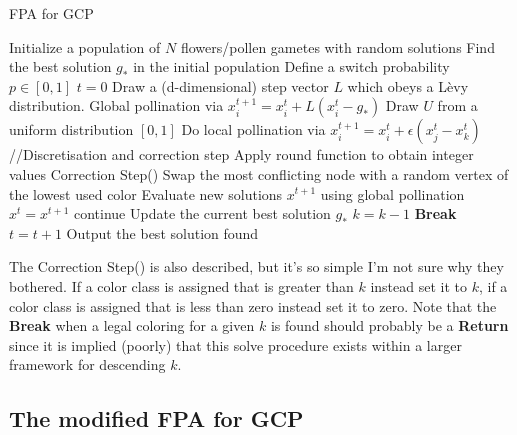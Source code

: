 \begin{algorithm}[H]
    \caption{FPA for GCP}
    \label{FPA1}
    \begin{algorithmic}[1] %
         			
			\State Initialize a population of $N$ flowers/pollen gametes with random solutions
			\State Find the best solution $g_*$ in the initial population
			\State Define a switch probability $p \in [0,1]$
			\State $t=0$
					 
						\State Draw a (d-dimensional) step vector $L$ which obeys a L\`evy distribution.
						\State Global pollination via $x_i^{t+1} = x_i^{t} + L(x_i^{t} - g_*)$
					\Else
						\State Draw $U$ from a uniform distribution $[0,1]$
						\State Do local pollination via $x_i^{t+1} = x_i^{t} + \epsilon(x_j^{t} - x_k^{t})$
					\EndIf
					\State //Discretisation and correction step
					\State Apply round function to obtain integer values
					\State Correction Step() 
						\State Swap the most conflicting node with a random vertex of the lowest used color
						\State Evaluate new solutions $x^{t+1}$ using global pollination
							\State $x^t = x^{t+1}$
						\EndIf
					\Else continue
					\EndIf
				\EndFor
				\State Update the current best solution $g_*$
						\State $k = k-1$
						\State \textbf{Break}
					\EndIf
			\State $t = t+1$
			\EndWhile
			\State Output the best solution found
		\EndProcedure
    \end{algorithmic}
\end{algorithm}


The Correction Step() is also described, but it's so simple I'm not sure why they bothered. If a color class is assigned that is greater than $k$ instead set it to $k$, if a color class is assigned that is less than zero instead set it to zero.
Note that the \textbf{Break} when a legal coloring for a given $k$  is found should probably be a \textbf{Return} since it is implied (poorly) that this solve procedure exists within a larger framework for descending $k$.


\subsection{The modified FPA for GCP}

